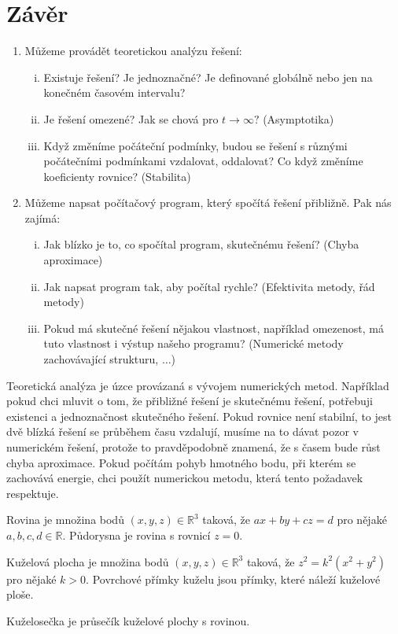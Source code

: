 \section{Závěr}
\begin{enumerate}
	\item Můžeme provádět teoretickou analýzu řešení:
	\begin{enumerate}[(i)]
	\item Existuje řešení? Je jednoznačné? Je definované globálně nebo jen na konečném časovém intervalu?
	\item Je řešení omezené? Jak se chová pro $t\to \infty?$ (Asymptotika)
	\item Když změníme počáteční podmínky, budou se řešení s různými počátečními podmínkami vzdalovat, oddalovat? Co když změníme koeficienty rovnice? (Stabilita)
	\end{enumerate}
	\item Můžeme napsat počítačový program, který spočítá řešení přibližně. Pak nás zajímá:
	\begin{enumerate}[(i)]
	\item Jak blízko je to, co spočítal program, skutečnému řešení? (Chyba aproximace)
	\item Jak napsat program tak, aby počítal rychle? (Efektivita metody, řád metody)
	\item Pokud má skutečné řešení nějakou vlastnost, například omezenost, má tuto vlastnost i výstup našeho programu? (Numerické metody zachovávající strukturu, $\hdots$)
	\end{enumerate}
\end{enumerate}
Teoretická analýza je úzce provázaná s vývojem numerických metod. Například pokud chci mluvit o tom, že přibližné řešení je  skutečnému řešení, potřebuji existenci a jednoznačnost skutečného řešení. Pokud rovnice není stabilní, to jest dvě blízká řešení se průběhem času vzdalují, musíme na to dávat pozor v numerickém řešení, protože to pravděpodobně znamená, že s časem bude růst chyba aproximace. Pokud počítám pohyb hmotného bodu, při kterém se zachovává energie, chci použít numerickou metodu, která tento požadavek respektuje.




\begin{definice}[Kuželosečka]
  \item Rovina je množina bodů $(x,y,z)\in \mathbb{R}^{3}$ taková, že $ax+by+cz=d$ pro nějaké $a,b,c,d\in \mathbb{R}.$ Půdorysna je rovina s rovnicí $z=0.$
  \item Kuželová plocha je množina bodů $(x,y,z)\in \mathbb{R}^{3}$ taková, že $z^{2}=k^{2}(x^{2}+y^{2})$ pro nějaké $k>0.$ Povrchové přímky kuželu jsou přímky, které náleží kuželové ploše.
  \item Kuželosečka je průsečík kuželové plochy s rovinou.
\end{definice}

